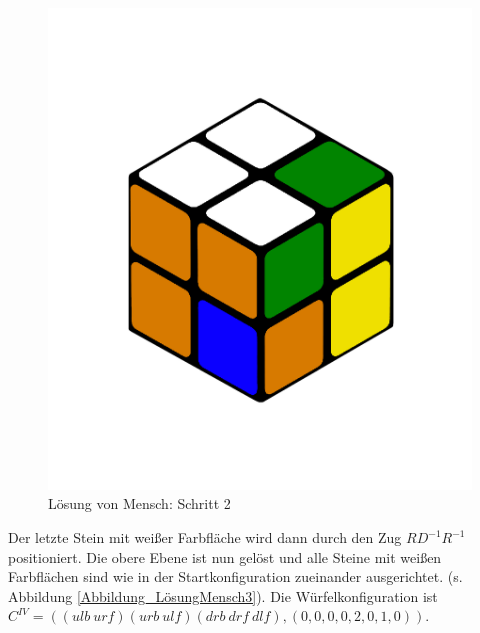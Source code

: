 \documentclass[12pt,a4paper, usenames, dvipsnames]{article}
\theoremstyle{mystyle}
\theoremstyle{definition}
\begin{document}
\begin{figure}[H]
\centering
\includegraphics[scale=0.12]{menschSchritt2.png}
\caption[Lösung von Mensch: Schritt 2]{Lösung von Mensch: Schritt 2}
\label{Abbildung_LösungMensch2}
\end{figure}

Der letzte Stein mit weißer Farbfläche wird dann durch den Zug $RD^{-1}R^{-1}$ positioniert. Die obere Ebene ist nun gelöst und alle Steine mit weißen Farbflächen sind wie in der Startkonfiguration zueinander ausgerichtet. (s. Abbildung \ref{Abbildung_LösungMensch3}).
Die Würfelkonfiguration ist $C^{IV}=(( \textit{ulb} \ \textit{urf} )( \textit{urb} \ \textit{ulf} )( \textit{drb} \ \textit{drf} \ \textit{dlf} ),(0,0,0,0,2,0,1,0))$.
\end{document}
